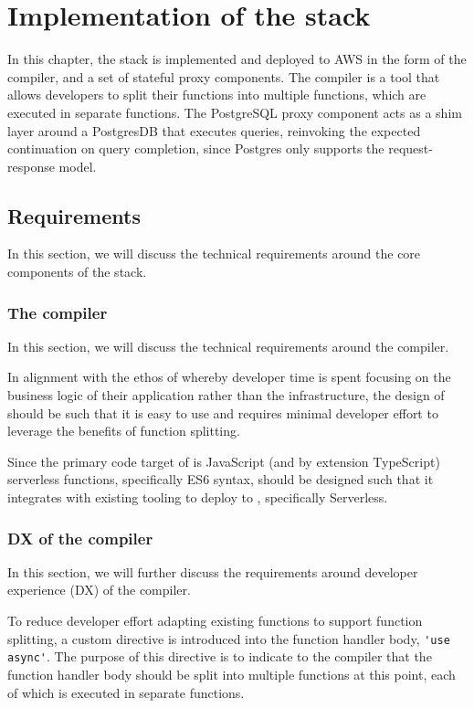 \chapter{Implementation of the \faaas{} stack}
\label{chap:impl}
In this chapter, the \faaas{} stack is implemented and deployed to AWS in the form of the \faaasc{} compiler, and a set of stateful proxy components. The \faaasc{} compiler is a tool that allows developers to split their functions into multiple functions, which are executed in separate \awslambda{} functions. The PostgreSQL proxy component acts as a shim layer around a PostgresDB that executes queries, reinvoking the expected continuation on query completion, since Postgres only supports the request-response model.

\section{Requirements}
In this section, we will discuss the technical requirements around the core components of the \faaas{} stack.

\cprotect\subsection{The \faaasc{} compiler}
In this section, we will discuss the technical requirements around the \faaasc{} compiler.

In alignment with the ethos of \faas{} whereby developer time is spent focusing on the business logic of their application rather than the infrastructure, the design of \faaasc{} should be such that it is easy to use and requires minimal developer effort to leverage the benefits of function splitting.

Since the primary code target of \faaasc{} is JavaScript (and by extension TypeScript) serverless functions, specifically ES6 syntax, \faaasc{} should be designed such that it integrates with existing tooling to deploy to \awslambda{}, specifically Serverless\cite{serverlessServerlessZeroFrictionServerless2024}.

\cprotect\subsection{DX of the \faaasc{} compiler}
In this section, we will further discuss the requirements around developer experience (DX) of the \faaasc{} compiler.

To reduce developer effort adapting existing functions to support function splitting, a custom directive is introduced into the function handler body, \verb|'use async'|. The purpose of this directive is to indicate to the \faaasc{} compiler that the function handler body should be split into multiple functions at this point, each of which is executed in separate \awslambda{} functions.

